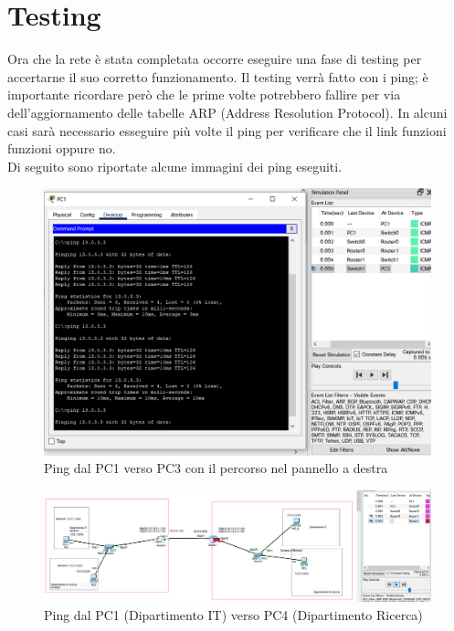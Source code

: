 \documentclass[a4paper,12pt]{report}
\begin{document}
\chapter{Testing}
\label{chap:testing}
Ora che la rete è stata completata occorre eseguire una fase di testing per accertarne il suo corretto funzionamento.
%
Il testing verrà fatto con i ping; è importante ricordare però che le prime volte potrebbero fallire per via dell'aggiornamento delle tabelle ARP (Address Resolution Protocol).
%
In alcuni casi sarà necessario esseguire più volte il ping per verificare che il link funzioni funzioni oppure no.
%
\\Di seguito sono riportate alcune immagini dei ping eseguiti.
\begin{figure}[H]
\includegraphics[width=\textwidth]{pc1_pc3_ping_successful.png}
\caption{Ping dal PC1 verso PC3 con il percorso nel pannello a destra}
\label{fig:pc3_ping_successful}
\end{figure}
\begin{figure}[H]
\includegraphics[width=\textheight, angle=-90,origin=c]{pc1_pc4_ping_fail.png}
\caption{Ping dal PC1 (Dipartimento IT) verso PC4 (Dipartimento Ricerca)}
\label{fig:pc1_pc4_ping_fail}
\end{figure}
\end{document}
